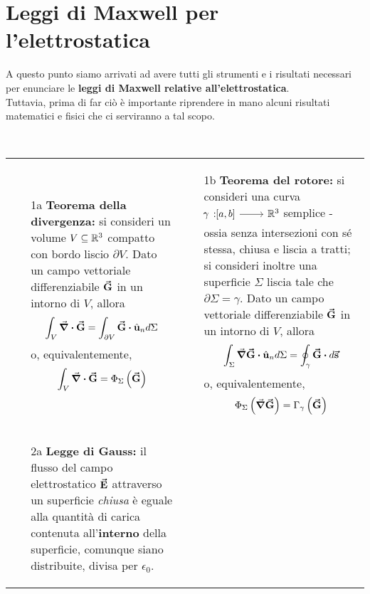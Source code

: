 \section{Leggi di Maxwell per l'elettrostatica}
A questo punto siamo arrivati ad avere tutti gli strumenti e i risultati necessari per enunciare le \textbf{leggi di Maxwell relative all'elettrostatica}.\\
Tuttavia, prima di far ciò è importante riprendere in mano alcuni risultati matematici e fisici che ci serviranno a tal scopo.
\begin{remember}~\\
		\begin{tabular}{p{}p{}}
			\begin{itemize}
				\item[1a] \textbf{Teorema della divergenza:} si consideri un volume $V\subseteq\mathbb{R}^3$ compatto con bordo liscio $\partial V$. Dato un campo vettoriale differenziabile $\vb*{\va{G}}$ in un intorno di $V$, allora
				\begin{equation*}
					\int_V\div{\vba{G}}=\int_{\partial V}\vba{G}\vdot \vbh{u}_nd\Sigma
				\end{equation*}
				o, equivalentemente,
				\begin{equation*}
					\int_V\div{\vb*{\va{G}}}=\Phi_\Sigma\left(\vb*{\va{G}}\right)
				\end{equation*}
			\end{itemize} &
			\begin{itemize}
			\item[1b] \textbf{Teorema del rotore:} si consideri una curva $\funz[\gamma]{\left[a,b\right]}{\realset^3}$ semplice - ossia senza intersezioni con sé stessa, chiusa e liscia a tratti; si consideri inoltre una superficie $\Sigma$ liscia tale che $\partial \Sigma=\gamma$. Dato un campo vettoriale differenziabile $\vb*{\va{G}}$ in un intorno di $V$, allora
			\begin{equation*}
				\int_\Sigma\grad{\vba{G}}\vdot\vbh{u}_nd\Sigma=\oint_{\gamma}\vba{G}\vdot d\vba{s}
			\end{equation*}
			o, equivalentemente,
			\begin{equation*}
				\Phi_\Sigma\left(\grad{\vb*{\va{G}}}\right)=\Gamma_\gamma\left(\vb*{\va{G}}\right)
			\end{equation*}
		\end{itemize}\\
			\begin{itemize}
				\item[2a] \textbf{Legge di Gauss:} il flusso del campo elettrostatico $\vb*{\va{E}}$ attraverso un superficie \textit{chiusa} è eguale alla quantità di carica contenuta all'\textbf{interno} della superficie, comunque siano distribuite, divisa per $\epsilon_0$.

\end{itemize}
\end{tabular}
\end{remember}
